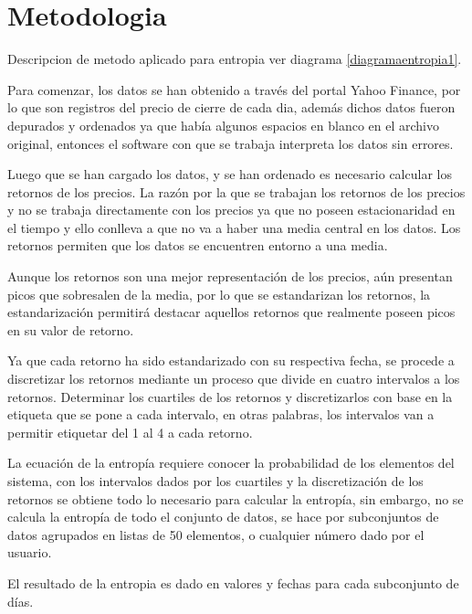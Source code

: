 %
\chapter{Metodologia}
\label{Metodologia}

Descripcion de metodo aplicado para entropia  ver diagrama \ref{diagramaentropia1}.

Para comenzar, los datos se han obtenido a través del portal Yahoo Finance, por lo que son registros del precio de cierre de cada dia, además dichos datos fueron depurados y ordenados ya que había algunos espacios en blanco en el archivo original, entonces el software con que se trabaja interpreta los datos sin errores. 

Luego que se han cargado los datos, y se han ordenado es necesario calcular los retornos de los precios. La razón por la que se trabajan los retornos de los precios y no se trabaja directamente con los precios ya que no poseen estacionaridad en el tiempo y ello conlleva a que no va a haber una media central en los datos. Los retornos permiten que los datos se encuentren entorno a una media.

Aunque los retornos son una mejor representación de los precios, aún presentan picos que sobresalen de la media, por lo que se estandarizan los retornos, la estandarización permitirá destacar aquellos retornos que realmente poseen picos en su valor de retorno. 

Ya que cada retorno ha sido estandarizado con su respectiva fecha,  se procede a discretizar los retornos mediante un proceso que divide en cuatro intervalos a los retornos. Determinar los cuartiles de los retornos y discretizarlos con base en la etiqueta que se pone a cada intervalo, en otras palabras, los intervalos van a permitir etiquetar del 1 al 4 a cada retorno. 

La ecuación de la entropía requiere conocer la probabilidad de los elementos del sistema, con los intervalos dados por los cuartiles y la discretización de los retornos se obtiene todo lo necesario para calcular la entropía, sin embargo, no se calcula la entropía de todo el conjunto de datos, se hace por subconjuntos de datos agrupados en listas de 50 elementos, o cualquier número dado por el usuario.

El resultado de la entropia es dado en valores y fechas para cada subconjunto de días.

